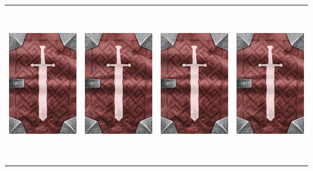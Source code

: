 \documentclass{minimal}
\begin{document}
{\begin{longtable}{llll}
\includegraphics[width=44mm,height=68mm]{./22-28/gh-022-heavy-greaves-back.png} &
\includegraphics[width=44mm,height=68mm]{./22-28/gh-022-heavy-greaves-back.png} &
\includegraphics[width=44mm,height=68mm]{./15-21/gh-021-stun-powder-back.png} &
\includegraphics[width=44mm,height=68mm]{./15-21/gh-021-stun-powder-back.png}\\ 

\end{longtable}}
\end{document}
